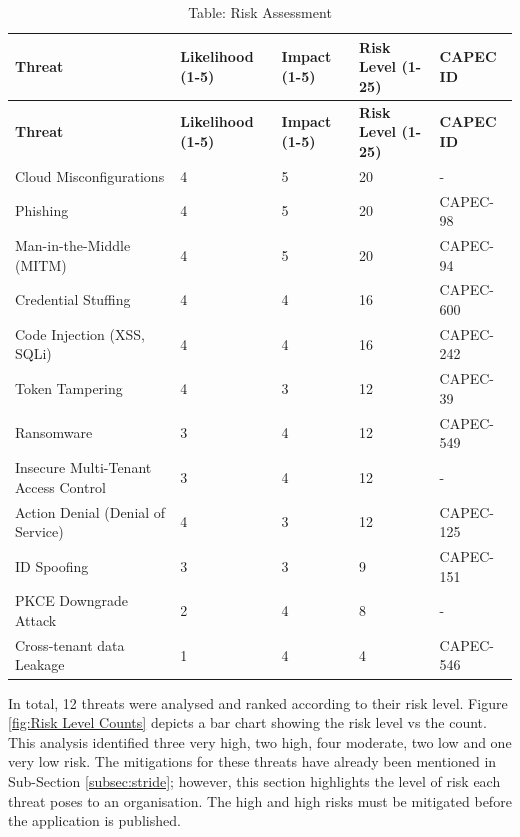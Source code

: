 
\begin{longtable}{|p{4cm}|p{2cm}|p{2cm}|p{2cm}|p{3cm}|}
\caption{Table: Risk Assessment}
\label{table:risk_assessment}
\hline
\rowcolor{grey!15}
\textbf{Threat} & \textbf{Likelihood (1-5)} & \textbf{Impact (1-5)} & \textbf{Risk Level (1-25)} & \textbf{CAPEC ID}\\
\hline
\endfirsthead

\hline
\rowcolor{grey!15}
\textbf{Threat} & \textbf{Likelihood (1-5)} & \textbf{Impact (1-5)} & \textbf{Risk Level (1-25)} & \textbf{CAPEC ID}\\
\hline
\endhead

\hline
\endfoot

\hline
\endlastfoot
Cloud Misconfigurations & 4 & 5 & \cellcolor{red!90} 20 & - \\
\hline
Phishing & 4 & 5 & \cellcolor{red!90} 20 & CAPEC-98  \\
\hline
Man-in-the-Middle (MITM) & 4 & 5 & \cellcolor{red!90} 20 &  CAPEC-94\\
\hline
Credential Stuffing & 4 & 4 & \cellcolor{red!60} 16 & CAPEC-600 \\
\hline
Code Injection (XSS, SQLi) & 4 & 4 & \cellcolor{red!60} 16 & CAPEC-242 \\
\hline
Token Tampering & 4 & 3 &  \cellcolor{yellow!90} 12 &CAPEC-39 \\
\hline
Ransomware & 3 & 4 &  \cellcolor{yellow!90} 12 & CAPEC-549 \\
\hline
Insecure Multi-Tenant Access Control & 3 & 4 &  \cellcolor{yellow!90} 12 & - \\
\hline
Action Denial (Denial of Service) & 4 & 3 &  \cellcolor{yellow!90} 12 & CAPEC-125\\
\hline
ID Spoofing & 3 & 3 &  \cellcolor{green!20} 9 & CAPEC-151\\
\hline

PKCE Downgrade Attack & 2 & 4 & \cellcolor{green!20} 8 & -\\
\hline
Cross-tenant data Leakage & 1 & 4 &  \cellcolor{ForestGreen} 4 & CAPEC-546 \\
\hline

\end{longtable}
 In total, 12 threats were analysed and ranked according to their risk level. Figure \ref{fig:Risk Level Counts} depicts a bar chart showing the risk level vs the count. This analysis identified three very high, two high, four moderate, two low and one very low risk. The mitigations for these threats have already been mentioned in Sub-Section \ref{subsec:stride}; however, this section highlights the level of risk each threat poses to an organisation. The high and high risks must be mitigated before the application is published. 

